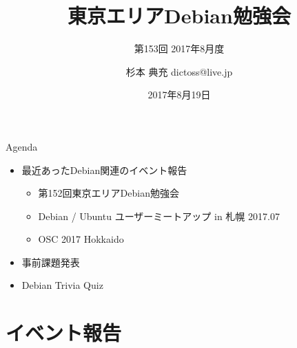\title{東京エリアDebian勉強会}
\subtitle{第153回 2017年8月度}
\author{杉本 典充  dictoss@live.jp}
\date{2017年8月19日}



\begin{frame}
\titlepage{}
\end{frame}

\begin{frame}{Agenda}
 \begin{minipage}[t]{0.45\hsize}
  \begin{itemize}
  \item 最近あったDebian関連のイベント報告
	\begin{itemize}
	\item 第152回東京エリアDebian勉強会
    \item Debian / Ubuntu ユーザーミートアップ in 札幌 2017.07
    \item OSC 2017 Hokkaido
	\end{itemize}
  \item 事前課題発表
  \end{itemize}
 \end{minipage}
 \begin{minipage}[t]{0.45\hsize}
  \begin{itemize}
   \item Debian Trivia Quiz
  \end{itemize}
 \end{minipage}
\end{frame}

\section{イベント報告}

